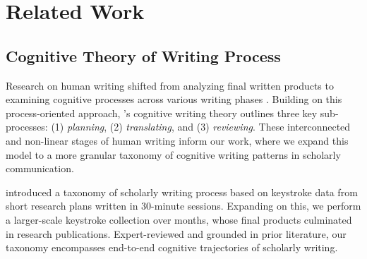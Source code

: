 \section{Related Work}
\subsection{Cognitive Theory of Writing Process}

Research on human writing shifted from analyzing final written products to examining cognitive processes across various writing phases \cite{diederich1974measuring, Krapels1990SecondLW, macarthur2016writing}. 
Building on this process-oriented approach, \citet{f508427a-e4c0-3d6a-8abf-03a5d21ec6c4}’s cognitive writing theory outlines three key sub-processes: (1) \textit{planning}, (2) \textit{translating}, and (3) \textit{reviewing}. These interconnected and non-linear stages of human writing inform our work, where we expand this model to a more granular taxonomy of cognitive writing patterns in scholarly communication.

\citet{koo2023decoding} introduced a taxonomy of scholarly writing process based on keystroke data from short research plans written in 30-minute sessions. Expanding on this, we perform a larger-scale keystroke collection over months, whose final products culminated in research publications. Expert-reviewed and grounded in prior literature, our taxonomy encompasses end-to-end cognitive trajectories of scholarly writing.




